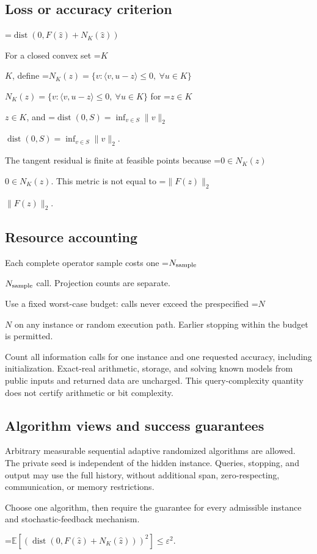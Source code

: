 \documentclass[10pt,a4paper]{article}
\newcommand{\AtlasMath}[1]{\par\begingroup\centering\setbox0=\hbox{$\displaystyle #1$}\ifdim\wd0>1.4\linewidth\typeout{ATLAS WIDE FORMULA: \the\wd0}\fi\ifdim\wd0>\linewidth\resizebox{\linewidth}{!}{\box0}\else\box0\fi\par\endgroup}
\newcommand{\AtlasInlineMath}[1]{\begingroup\setbox0=\hbox{$#1$}\ifdim\wd0>.4\linewidth\endgroup\AtlasMath{#1}\else\endgroup$#1$\fi}
\begin{document}
\subsection{Loss or accuracy criterion}

\AtlasMath{\operatorname{dist}(0,F(\widehat{z})+N_K(\widehat{z}))}


For a closed convex set \AtlasInlineMath{K}, define \AtlasInlineMath{N_K(z)=\{v:\langle v,u-z\rangle\le0,\ \forall u\in K\}} for \AtlasInlineMath{z\in K}, and \AtlasInlineMath{\operatorname{dist}(0,S)=\inf_{v\in S}\|v\|_2}.

The tangent residual is finite at feasible points because \AtlasInlineMath{0\in N_K(z)}. This metric is not equal to \AtlasInlineMath{\|F(z)\|_2}.

\subsection{Resource accounting}
Each complete operator sample costs one \AtlasInlineMath{N_{\rm sample}} call. Projection counts are separate.

Use a fixed worst-case budget: calls never exceed the prespecified \AtlasInlineMath{N} on any instance or random execution path. Earlier stopping within the budget is permitted.

Count all information calls for one instance and one requested accuracy, including initialization. Exact-real arithmetic, storage, and solving known models from public inputs and returned data are uncharged. This query-complexity quantity does not certify arithmetic or bit complexity.

\subsection{Algorithm views and success guarantees}
Arbitrary measurable sequential adaptive randomized algorithms are allowed. The private seed is independent of the hidden instance. Queries, stopping, and output may use the full history, without additional span, zero-respecting, communication, or memory restrictions.

Choose one algorithm, then require the guarantee for every admissible instance and stochastic-feedback mechanism.


\AtlasMath{\mathbb{E}\!\left[\left(\operatorname{dist}(0,F(\widehat{z})+N_K(\widehat{z}))\right)^2\right]\le\varepsilon^2.}
\end{document}
